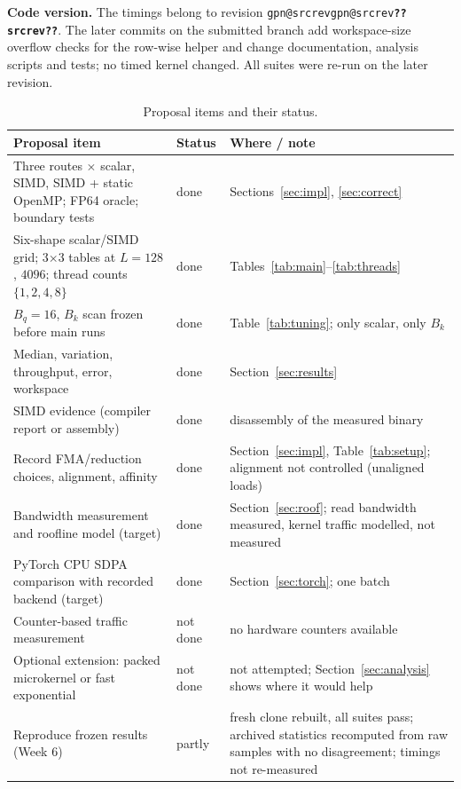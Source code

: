 \documentclass[11pt,a4paper]{article}
\makeatletter
\newcommand{\gpn}[1]{\ifcsname gpn@#1\endcsname\csname gpn@#1\endcsname\else\textbf{??#1??}\GenericWarning{}{Undefined number #1}\fi}
\newcommand{\code}[1]{\texttt{#1}}
\newcommand{\Bq}{B_q}
\newcommand{\Bk}{B_k}
\makeatother
\begin{document}
\textbf{Code version.} The timings belong to revision \code{\gpn{srcrev}}. The later commits on the submitted branch add workspace-size overflow checks for the row-wise helper and change documentation, analysis scripts and tests; no timed kernel changed. All suites were re-run on the later revision.

\begin{table}[!htbp]
\centering\small
\caption{Proposal items and their status.}
\label{tab:coverage}
\begin{tabularx}{\textwidth}{@{}Y l Y@{}}
\toprule
Proposal item & Status & Where / note \\
\midrule
Three routes $\times$ scalar, SIMD, SIMD + static OpenMP; FP64 oracle; boundary tests & done & Sections~\ref{sec:impl}, \ref{sec:correct} \\
Six-shape scalar/SIMD grid; 3$\times$3 tables at $L=128$, $4096$; thread counts $\{1,2,4,8\}$ & done & Tables~\ref{tab:main}--\ref{tab:threads} \\
$\Bq=16$, $\Bk$ scan frozen before main runs & done & Table~\ref{tab:tuning}; only scalar, only $\Bk$ \\
Median, variation, throughput, error, workspace & done & Section~\ref{sec:results} \\
SIMD evidence (compiler report or assembly) & done & disassembly of the measured binary \\
Record FMA/reduction choices, alignment, affinity & done & Section~\ref{sec:impl}, Table~\ref{tab:setup}; alignment not controlled (unaligned loads) \\
Bandwidth measurement and roofline model (target) & done & Section~\ref{sec:roof}; read bandwidth measured, kernel traffic modelled, not measured \\
PyTorch CPU SDPA comparison with recorded backend (target) & done & Section~\ref{sec:torch}; one batch \\
Counter-based traffic measurement & not done & no hardware counters available \\
Optional extension: packed microkernel or fast exponential & not done & not attempted; Section~\ref{sec:analysis} shows where it would help \\
Reproduce frozen results (Week 6) & partly & fresh clone rebuilt, all suites pass; archived statistics recomputed from raw samples with no disagreement; timings not re-measured \\
\bottomrule
\end{tabularx}
\end{table}
\end{document}
